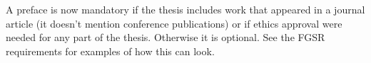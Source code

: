 \documentclass[\main/thesis.tex]{subfiles}
\begin{document}
\begin{preface} 
A preface is now mandatory if the thesis includes work that appeared in a journal article (it doesn't mention conference publications) or if ethics approval were needed for any part of the thesis.
Otherwise it is optional.
See the FGSR requirements for examples of how this can look.
\end{preface}
\end{document}
